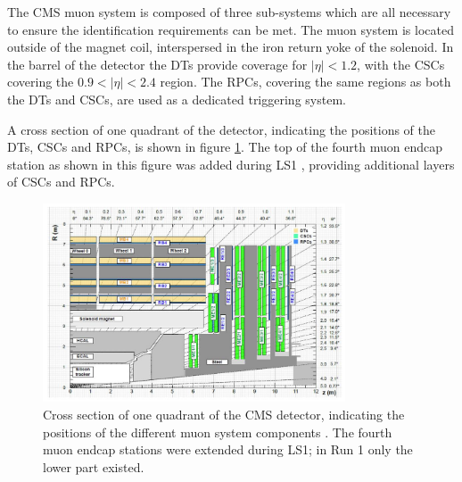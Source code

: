 The \ac{CMS} muon system \cite{cms-jinst} is composed of three sub-systems which
are all necessary to ensure the identification requirements can be met. The muon system is located
outside of the magnet coil, interspersed in the iron return yoke of the solenoid.
In the barrel of the detector the \acp{DT} provide coverage for $|\eta|<1.2$, with
the \acp{CSC} covering the $0.9<|\eta|<2.4$ region. The \acp{RPC}, covering the same
regions as both the \acp{DT} and \acp{CSC}, are used as a dedicated triggering system.

A cross section of one quadrant of the detector, indicating
the positions of the \acp{DT}, \acp{CSC} and \acp{RPC}, is shown in figure \ref{fig:CMS_MuonSystem}.
The top of the fourth muon endcap station as shown in this figure was added during \ac{LS1} \cite{cms-muon-upgrade}, providing
additional layers of \acp{CSC} and \acp{RPC}.
\begin{figure}[h!]
\begin{center}
\includegraphics[width=0.8\textwidth]{./Detector/Plots/MuonSystemUpgrade.png}
\caption[Cross section of one quadrant of the CMS detector,
indicating the positions of the different muon system components.]{Cross section of one quadrant of the CMS detector, indicating
the positions of the different muon system components \cite{cms-muon-upgrade}. The 
fourth muon endcap stations were extended during \ac{LS1}; in Run 1 only the lower
part existed.}
\label{fig:CMS_MuonSystem}
\end{center}
\end{figure}

